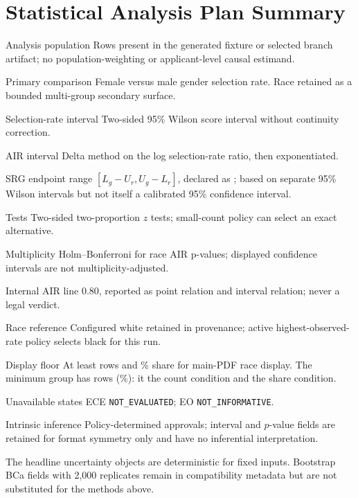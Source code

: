 \section{Statistical Analysis Plan Summary}

\begin{KeyValueList}
\item[Analysis population] Rows present in the generated fixture or selected branch artifact; no
population-weighting or applicant-level causal estimand.
\item[Primary comparison] Female versus male gender selection rate. Race retained as a bounded
multi-group secondary surface.
\item[Selection-rate interval] Two-sided 95\% Wilson score interval without continuity correction.
\item[AIR interval] Delta method on the log selection-rate ratio, then exponentiated.
\item[SRG endpoint range] $[L_g-U_r,U_g-L_r]$, declared as
; based on separate 95\% Wilson intervals but not
itself a calibrated 95\% confidence interval.
\item[Tests] Two-sided two-proportion $z$ tests; small-count policy can select an exact alternative.
\item[Multiplicity] Holm--Bonferroni for race AIR p-values; displayed confidence intervals are not
multiplicity-adjusted.
\item[Internal AIR line] 0.80, reported as point relation and interval relation; never a legal
verdict.
\item[Race reference] Configured white retained in provenance; active highest-observed-rate policy
selects black for this run.
\item[Display floor] At least \RaceDisplayMinGroupN{} rows and \RaceDisplayMinGroupPct{}\% share for
main-PDF race display. The minimum group has \RaceMinimumGroupN{} rows
(\RaceMinimumGroupPct{}\%): it \RaceCountFloorRelation{} the count condition and
\RaceShareFloorRelation{} the share condition.
\item[Unavailable states] ECE \texttt{NOT\_EVALUATED}; EO \texttt{NOT\_INFORMATIVE}.
\item[Intrinsic inference] Policy-determined approvals; interval and $p$-value fields are retained
for format symmetry only and have no inferential interpretation.
\end{KeyValueList}

The headline uncertainty objects are deterministic for fixed inputs. Bootstrap BCa fields with
2,000 replicates remain in compatibility metadata but are not substituted for the methods above.

